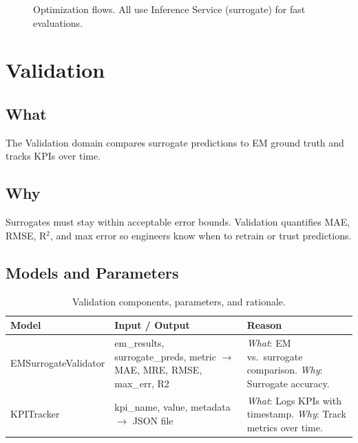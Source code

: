 \documentclass[11pt,a4paper]{article}
\begin{document}
\begin{figure}[htbp]
\centering
{}
\caption{Optimization flows. All use Inference Service (surrogate) for fast evaluations.}
\end{figure}

\section{Validation}

\subsection{What}
The Validation domain compares surrogate predictions to EM ground truth and tracks KPIs over time.

\subsection{Why}
Surrogates must stay within acceptable error bounds. Validation quantifies MAE, RMSE, R$^2$, and max error so engineers know when to retrain or trust predictions.

\subsection{Models and Parameters}

\begin{table}[htbp]
\centering
\small
\begin{tabularx}{\textwidth}{@{}lXX@{}}
\toprule
\textbf{Model} & \textbf{Input / Output} & \textbf{Reason} \\
\midrule
EMSurrogateValidator & em\_results, surrogate\_preds, metric $\to$ MAE, MRE, RMSE, max\_err, R2 & \emph{What}: EM vs.\ surrogate comparison. \emph{Why}: Surrogate accuracy. \\
\addlinespace
KPITracker & kpi\_name, value, metadata $\to$ JSON file & \emph{What}: Logs KPIs with timestamp. \emph{Why}: Track metrics over time. \\
\bottomrule
\end{tabularx}
\caption{Validation components, parameters, and rationale.}
\end{table}
\end{document}
